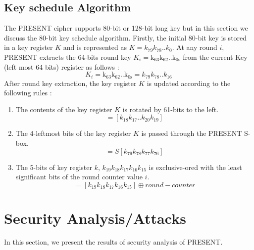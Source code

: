 \documentclass[journal=tosc,preprint]{iacrtrans}
\begin{document}
\subsection{Key schedule Algorithm}
The PRESENT cipher supports 80-bit or 128-bit long key but in this section we discuss the 80-bit key schedule algorithm. Firstly, the initial 80-bit key is stored in a key register $K$ and is represented as $K = k_{79}k_{78}$..$k_0$. At any round $i$, PRESENT extracts the 64-bits round key $K_i = \mathrm{k_{63}}\mathrm{k_{62}}$..$\mathrm{k_{0s}}$ from the current Key (left most 64 bits) register as follows : 
\begin{equation*}
K_i = \mathrm{k_{63}}\mathrm{k_{62}}..\mathrm{k_{0s}} = k_{79}k_{78}..k_{16}
\end{equation*}
After round key extraction, the key register $K$ is updated according to the following rules : 
\begin{enumerate}
	\item The contents of the key register $K$ is rotated by 61-bits to the left.
	\begin{equation*}
	[k_{79}k_{78}..k_{0}] = [k_{18}k_{17}..k_{20}k_{19}]
	\end{equation*}
	\item The 4-leftmost bits of the key register $K$ is passed through the PRESENT S-box.
	\begin{equation*}
	[k_{79}k_{78}k_{77}k_{76}] = S[k_{79}k_{78}k_{77}k_{76}]
	\end{equation*}
	\item The 5-bits of key register $k$, $k_{19}k_{18}k_{17}k_{16}k_{15}$ is exclusive-ored with the least significant bits of the round counter value $i$. 
	\begin{equation*}
	[k_{19}k_{18}k_{17}k_{16}k_{15}] = [k_{19}k_{18}k_{17}k_{16}k_{15}] \oplus round-counter
	\end{equation*}
\end{enumerate}
\section{Security Analysis/Attacks}
In this section, we present the results of security analysis of PRESENT.
\end{document}
